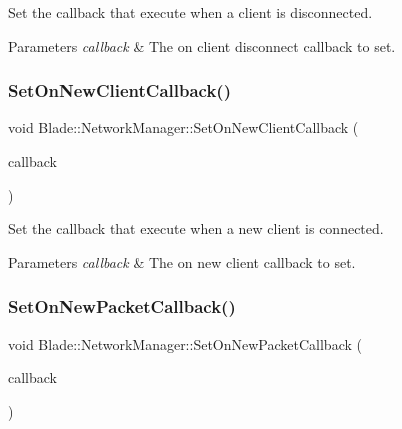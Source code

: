 Set the callback that execute when a client is disconnected. 


\begin{DoxyParams}{Parameters}
{\em callback} & The on client disconnect callback to set. \\
\hline
\end{DoxyParams}
\mbox{\label{class_blade_1_1_network_manager_a192f822f26e76829c2414f1505418a78}} 
\subsubsection{\texorpdfstring{Set\+On\+New\+Client\+Callback()}{SetOnNewClientCallback()}}
{\footnotesize\ttfamily void Blade\+::\+Network\+Manager\+::\+Set\+On\+New\+Client\+Callback (\begin{DoxyParamCaption}\item[{const On\+New\+Client\+Callback \&}]{callback }\end{DoxyParamCaption})\hspace{0.3cm}{\ttfamily [noexcept]}}



Set the callback that execute when a new client is connected. 


\begin{DoxyParams}{Parameters}
{\em callback} & The on new client callback to set. \\
\hline
\end{DoxyParams}
\mbox{\label{class_blade_1_1_network_manager_a12f5afdfc075b71ea82d4d657a78d780}} 
\subsubsection{\texorpdfstring{Set\+On\+New\+Packet\+Callback()}{SetOnNewPacketCallback()}}
{\footnotesize\ttfamily void Blade\+::\+Network\+Manager\+::\+Set\+On\+New\+Packet\+Callback (\begin{DoxyParamCaption}\item[{const On\+New\+Packet\+Callback \&}]{callback }\end{DoxyParamCaption})\hspace{0.3cm}{\ttfamily [noexcept]}}




